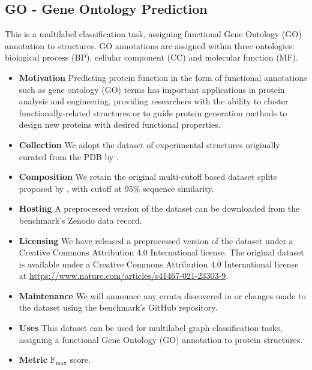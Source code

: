 \subsection{GO - Gene Ontology Prediction}
This is a multilabel classification task, assigning functional Gene Ontology (GO) annotation to structures. GO annotations are assigned within three ontologies: biological process (BP), cellular component (CC) and molecular function (MF).

\begin{itemize}
    \item \textbf{Motivation} Predicting protein function in the form of functional annotations such as gene ontology (GO) terms has important applications in protein analysis and engineering, providing researchers with the ability to cluster functionally-related structures or to guide protein generation methods to design new proteins with desired functional properties.
    \item \textbf{Collection} We adopt the dataset of experimental structures originally curated from the PDB by \citet{Gligorijevi2021}.
    \item \textbf{Composition} We retain the original multi-cutoff based dataset splits proposed by \citep{Gligorijevi2021}, with cutoff at 95\% sequence similarity.
    \item \textbf{Hosting} A preprocessed version of the dataset can be downloaded from the benchmark's Zenodo data record.%
    \item \textbf{Licensing} We have released a preprocessed version of the dataset under a Creative Commons Attribution 4.0 International license. The original dataset is available under a Creative Commons Attribution 4.0 International license at \url{https://www.nature.com/articles/s41467-021-23303-9}.
    \item \textbf{Maintenance} We will announce any errata discovered in or changes made to the dataset using the benchmark's GitHub repository.%
    \item \textbf{Uses} This dataset can be used for multilabel graph classification tasks, assigning a functional Gene Ontology (GO) annotation to protein structures.
    \item \textbf{Metric} $\mathrm{F}_{\mathrm{max}}$ score.
\end{itemize}
